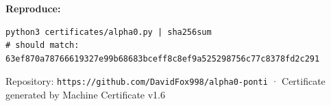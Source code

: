 \documentclass[11pt,letterpaper]{article}
\begin{document}
\vspace{1em}
\noindent\textbf{Reproduce:}
\begin{lstlisting}
python3 certificates/alpha0.py | sha256sum
# should match: 63ef870a78766619327e99b68683bceff8c8ef9a525298756c77c8378fd2c291
\end{lstlisting}

\vspace{0.5em}
\noindent\small Repository: \texttt{https://github.com/DavidFox998/alpha0-ponti} ·
Certificate generated by Machine Certificate v1.6
\end{document}

